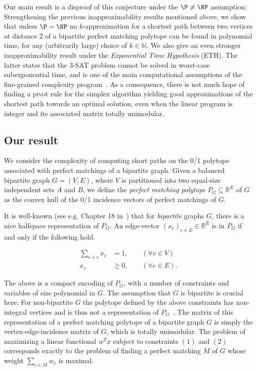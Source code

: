 \documentclass[runningheads]{llncs}
\begin{document}
Our main result is a disproof of this conjecture under the $\P\not=\NP$ assumption: Strengthening the previous inapproximability results mentioned above, we show that unless $\P=\NP$ no $k$-approximation for a shortest path between two vertices at distance $2$ of a bipartite perfect matching polytope can be found in polynomial time, for any (arbitrarily large) choice of $k\in \mathbb{N}$. We also give an even stronger inapproximability result under the \emph{Exponential Time Hypothesis} (ETH).
The latter states that the 3-SAT problem cannot be solved in worst-case subexponential time, and is one of the main computational assumptions of the fine-grained complexity program~\cite{W18}.
As a consequence, there is not much hope of finding a pivot rule for the simplex algorithm yielding good approximations of the shortest path towards an optimal solution, even when the linear program is integer and its associated matrix totally unimodular.

\subsection{Our result}

We consider the complexity of computing short paths on the 0/1 polytope associated with perfect matchings of a bipartite graph.
Given a balanced bipartite graph $G=(V,E)$, where $V$ is partitioned into two equal-size independent sets $A$ and $B$, we define the
\emph{perfect matching polytope} $P_G\subseteq \mathbb{R}^E$ of $G$ as the convex hull of the 0/1 incidence vectors of perfect matchings of $G$.

It is well-known (see e.g. Chapter 18 in~\cite{schrijver}) that for \emph{bipartite} graphs $G$, there is a nice halfspace representation of $P_G$. An edge-vector $(x_e)_{e \in E} \in \mathbb{R}^E$ is in $P_G$ if and only if the following hold.

\begin{align}
    \sum_{e \ni v}{x_e} &= 1,  \qquad (\forall v \in V) \\ 
    x_e &\ge 0, \qquad (\forall e \in E).
\end{align}

The above is a compact encoding of $P_G$, with a number of constraints and variables of size polynomial in $G$. The assumption that $G$ is bipartite is crucial here: For non-bipartite $G$ the polytope defined by the above constraints has non-integral vertices and is thus not a representation of $P_G$~\cite{schrijver}. The matrix of this representation of a perfect matching polytope of a bipartite graph $G$ is simply the vertex-edge-incidence matrix of $G$, which is totally unimodular. The problem of maximizing a linear functional $w^T x$ subject to constraints $(1)$ and $(2)$ corresponds exactly to the problem of finding a perfect matching $M$ of $G$ whose weight $\sum_{e \in M}{w_e}$ is maximal. 
\end{document}
